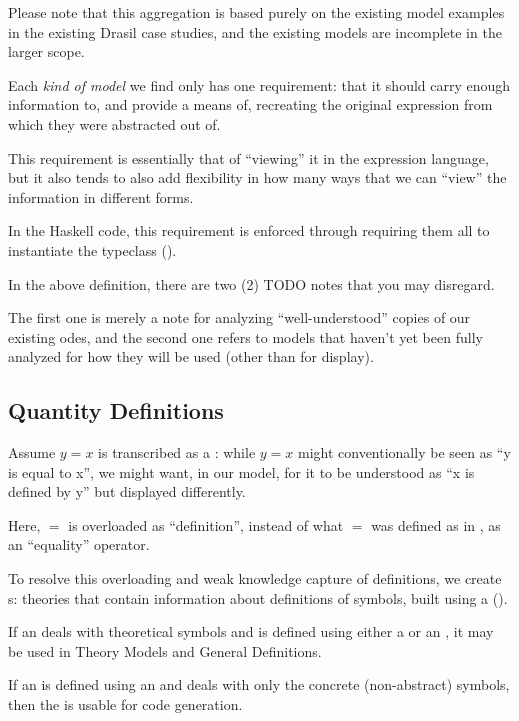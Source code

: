 Please note that this aggregation is based purely on the existing model examples
in the existing Drasil case studies, and the existing models are incomplete in
the larger scope.

Each \textit{kind of model} we find only has one requirement: that it should
carry enough information to, and provide a means of, recreating the original
expression from which they were abstracted out of.

This requirement is essentially that of ``viewing'' it in the expression
language, but it also tends to also add flexibility in how many ways that we can
``view'' the information in different forms.

In the Haskell code, this requirement is enforced through requiring them all to
instantiate the \Express{} typeclass ().

\currentModelKindsHaskell{}

In the above \ModelKinds{} definition, there are two (2) TODO notes that you may
disregard.

The first one is merely a note for analyzing ``well-understood'' copies of our
existing \acsp{ode}, and the second one refers to models that haven't yet been
fully analyzed for how they will be used (other than for display).

\subsection{Quantity Definitions}

\currentQDefinitionHaskell{}

Assume \(y = x\) is transcribed as a \RelationConcept{}: while \(y = x\) might
conventionally be seen as ``y is equal to x'', we might want, in our model, for
it to be understood as ``x is defined by y'' but displayed differently.

Here, \(=\) is overloaded as ``definition'', instead of what \(=\) was defined
as in \Expr{}, as an ``equality'' operator.

To resolve this overloading and weak knowledge capture of definitions, we create
\EquationalModel{}s: theories that contain information about definitions of
symbols, built using a \QDefinition{} ().

If an \EquationalModel{} deals with theoretical symbols and is defined using
either a \ModelExpr{} or an \Expr{}, it may be used in Theory Models and General
Definitions.

If an \EquationalModel{} is defined using an \Expr{} and deals with only the
concrete (non-abstract) symbols, then the \EquationalModel{} is usable for code
generation.

